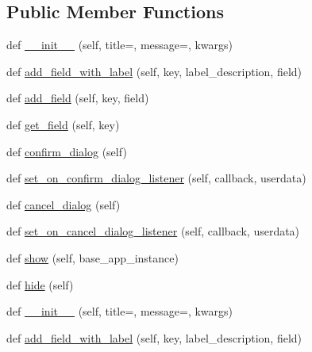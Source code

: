 \subsection*{Public Member Functions}
\begin{DoxyCompactItemize}
\item 
def \hyperlink{classremi_1_1gui_1_1GenericDialog_a5d6eda71557518b78261e1007d0e4b4b}{\+\_\+\+\_\+init\+\_\+\+\_\+} (self, title=\textquotesingle{}\textquotesingle{}, message=\textquotesingle{}\textquotesingle{}, kwargs)
\item 
def \hyperlink{classremi_1_1gui_1_1GenericDialog_a40e873d6cdd600eb2632ab60a504fac4}{add\+\_\+field\+\_\+with\+\_\+label} (self, key, label\+\_\+description, field)
\item 
def \hyperlink{classremi_1_1gui_1_1GenericDialog_aedb713b0aa165232509b5d64b56d93b7}{add\+\_\+field} (self, key, field)
\item 
def \hyperlink{classremi_1_1gui_1_1GenericDialog_abe3376922b34089d38e2af903708dc7f}{get\+\_\+field} (self, key)
\item 
def \hyperlink{classremi_1_1gui_1_1GenericDialog_afb62d4e48291115923d9dae74841a989}{confirm\+\_\+dialog} (self)
\item 
def \hyperlink{classremi_1_1gui_1_1GenericDialog_a255f09292492e190f01c87394fce2c15}{set\+\_\+on\+\_\+confirm\+\_\+dialog\+\_\+listener} (self, callback, userdata)
\item 
def \hyperlink{classremi_1_1gui_1_1GenericDialog_a23650c8959545f1a4c50b9b375f0412d}{cancel\+\_\+dialog} (self)
\item 
def \hyperlink{classremi_1_1gui_1_1GenericDialog_ae45abbd039d70a70f5134e843a7fb91e}{set\+\_\+on\+\_\+cancel\+\_\+dialog\+\_\+listener} (self, callback, userdata)
\item 
def \hyperlink{classremi_1_1gui_1_1GenericDialog_ad7ac0adef763e683bfc87a289392bb11}{show} (self, base\+\_\+app\+\_\+instance)
\item 
def \hyperlink{classremi_1_1gui_1_1GenericDialog_ab228c4ebfd696414b4a5c04f5ec55e67}{hide} (self)
\item 
def \hyperlink{classremi_1_1gui_1_1GenericDialog_a5d6eda71557518b78261e1007d0e4b4b}{\+\_\+\+\_\+init\+\_\+\+\_\+} (self, title=\textquotesingle{}\textquotesingle{}, message=\textquotesingle{}\textquotesingle{}, kwargs)
\item 
def \hyperlink{classremi_1_1gui_1_1GenericDialog_a40e873d6cdd600eb2632ab60a504fac4}{add\+\_\+field\+\_\+with\+\_\+label} (self, key, label\+\_\+description, field)
\item 

\end{DoxyCompactItemize}
